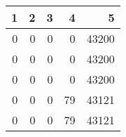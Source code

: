 \begin{tabular}{rrrrr}
\hline
   1 &   2 &   3 &   4 &     5 \\
\hline
   0 &   0 &   0 &   0 & 43200 \\
   0 &   0 &   0 &   0 & 43200 \\
   0 &   0 &   0 &   0 & 43200 \\
   0 &   0 &   0 &  79 & 43121 \\
   0 &   0 &   0 &  79 & 43121 \\
\hline
\end{tabular}